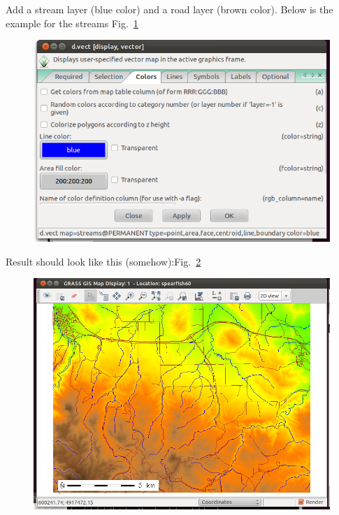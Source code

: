 Add a stream layer (blue color) and a road layer (brown color). Below is
the example for the streams Fig.~\ref{fig:grass007}

\begin{figure}[htbp]
   \centering
   \includegraphics[scale=0.45]{grass007.png}
   \caption{}
   \label{fig:grass007}
\end{figure}

Result should look like this (somehow):Fig.~\ref{fig:grass008}

\begin{figure}[htbp]
   \centering
   \includegraphics[scale=0.35]{grass008.png}
   \caption{}
   \label{fig:grass008}
\end{figure}

